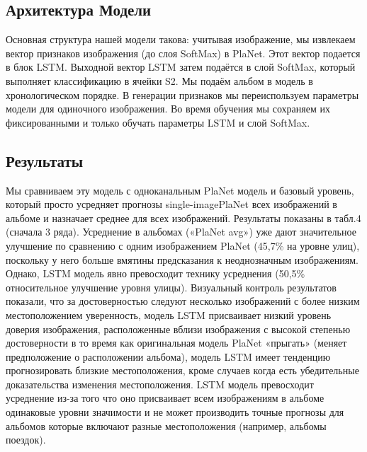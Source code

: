 \subsection{Архитектура Модели}
Основная структура нашей модели такова:
учитывая изображение, мы извлекаем вектор признаков изображения (до слоя SoftMax) в PlaNet. Этот вектор подается в блок LSTM. Выходной вектор LSTM затем подаётся в слой SoftMax, который
выполняет классификацию в ячейки S2. Мы подаём альбом в модель в хронологическом порядке. В генерации признаков мы переиспользуем параметры модели для одиночного изображения. Во время обучения мы сохраняем их фиксированными и только обучать параметры LSTM и слой SoftMax.
\subsection{Результаты} Мы сравниваем эту модель с одноканальным PlaNet
модель и базовый уровень, который просто усредняет прогнозы single-imagePlaNet всех изображений в альбоме и назначает
среднее для всех изображений. Результаты показаны в табл.4 (сначала
3 ряда). Усреднение в альбомах («PlaNet avg») уже
дают значительное улучшение по сравнению с одним изображением PlaNet
(45,7\% на уровне улиц), поскольку у него больше
вмятины предсказания к неоднозначным изображениям. Однако, LSTM
модель явно превосходит технику усреднения (50,5\%
относительное улучшение уровня улицы). Визуальный контроль
результатов показали, что за достоверностью следуют несколько изображений с более низким местоположением уверенность, модель LSTM присваивает низкий уровень доверия изображения, расположенные вблизи изображения с высокой степенью достоверности в то время как оригинальная модель PlaNet «прыгать» (меняет предположение о расположении альбома), модель LSTM имеет тенденцию прогнозировать близкие местоположения, кроме случаев когда
есть убедительные доказательства изменения местоположения. LSTM
модель превосходит усреднение из-за того что оно присваивает всем изображениям в альбоме одинаковые уровни значимости и не может производить точные прогнозы для альбомов которые включают разные местоположения (например, альбомы поездок).

